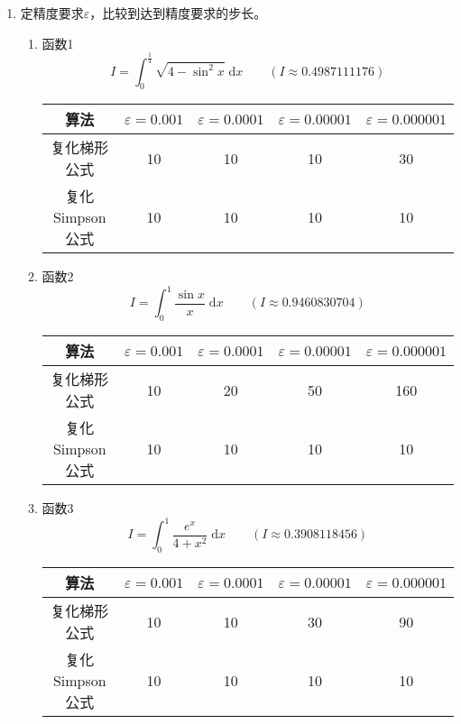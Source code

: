 \documentclass[a4paper,11pt]{article}
\begin{document}
\begin{enumerate}
	\item 定精度要求$\varepsilon$，比较到达到精度要求的步长。
	\begin{enumerate}[(1)]
		\item 函数1
			\begin{displaymath}
				I=\int_{0}^{\frac{1}{4}}\sqrt{4-\sin^{2}{x}}\;\mathrm{d}x\qquad(I\approx{}0.4987111176)
			\end{displaymath}
			\begin{center}
				\begin{tabular}{|c|c|c|c|c|}
					\hline
					算法 & $\varepsilon=0.001$ & $\varepsilon=0.0001$ & $\varepsilon=0.00001$ & $\varepsilon=0.000001$ \\
					\hline 
					复化梯形公式 & 10 & 10 & 10 & 30\\
					\hline
					复化Simpson公式 & 10 & 10 & 10 & 10\\
					\hline
				\end{tabular}
			\end{center}
		\item 函数2
			\begin{displaymath}
				I=\int_{0}^{1}\frac{\sin{x}}{x}\;\mathrm{d}x\qquad(I\approx{}0.9460830704)
			\end{displaymath}
			\begin{center}
				\begin{tabular}{|c|c|c|c|c|}
					\hline
					算法 & $\varepsilon=0.001$ & $\varepsilon=0.0001$  & $\varepsilon=0.00001$ & $\varepsilon=0.000001$ \\
					\hline 
					复化梯形公式 & 10 & 20 & 50 & 160 \\
					\hline
					复化Simpson公式 & 10 & 10 & 10 & 10 \\
					\hline
				\end{tabular}
			\end{center}
		\item 函数3
			\begin{displaymath}
				I=\int_{0}^{1}\frac{e^{x}}{4+x^2}\;\mathrm{d}x\qquad(I\approx{}0.3908118456)
			\end{displaymath}
			\begin{center}
				\begin{tabular}{|c|c|c|c|c|}
					\hline
					算法 & $\varepsilon=0.001$ & $\varepsilon=0.0001$  & $\varepsilon=0.00001$ & $\varepsilon=0.000001$ \\
					\hline 
					复化梯形公式 & 10 & 10 & 30 & 90\\
					\hline
					复化Simpson公式 & 10 & 10 & 10 & 10\\

\end{tabular}
\end{center}
\end{enumerate}
\end{enumerate}
\end{document}
